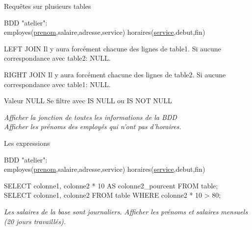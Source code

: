 \documentclass[xetex,dvipsnames]{beamer}
\begin{document}
\begin{frame}[t]{Requêtes sur plusieurs tables}
\begin{small}
		BDD "atelier": \\employes(\underline{prenom},salaire,adresse,service) horaires(\underline{service},debut,fin)
\end{small}	
	\begin{alertblock}{LEFT JOIN}
		Il y aura forcément chacune des lignes de table1. Si aucune correspondance avec table2: NULL.
	\end{alertblock}
	\begin{alertblock}{RIGHT JOIN}
		Il y aura forcément chacune des lignes de table2. Si aucune correspondance avec table1: NULL.
	\end{alertblock}
\begin{footnotesize}
	\begin{block}{Valeur NULL}
		Se filtre avec IS NULL ou IS NOT NULL
	\end{block}
\end{footnotesize}
		\textit{Afficher la jonction de toutes les informations de la BDD}\\
		\textit{Afficher les prénoms des employés qui n'ont pas d'horaires.}\\

\end{frame}

\begin{frame}[t]{Les expressions}
\begin{small}
		BDD "atelier": \\employes(\underline{prenom},salaire,adresse,service) horaires(\underline{service},debut,fin)
\end{small}	
	\begin{alertblock}{}
	SELECT colonne1, colonne2  * 10 AS colonne2\_pourcent FROM table;\\
	SELECT colonne1, colonne2 FROM table WHERE colonne2 * 10 > 80;
	\end{alertblock}

	\textit{Les salaires de la base sont journaliers. Afficher les prénoms et salaires mensuels (20 jours travaillés).}
\end{frame}
\end{document}
